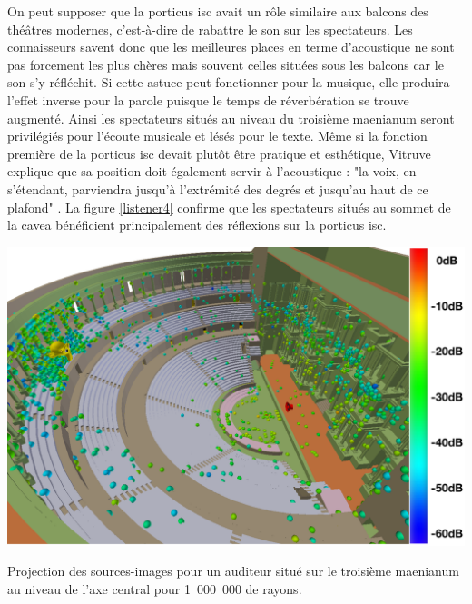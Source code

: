  

On peut supposer que la \gls{porticus isc} avait un rôle similaire aux balcons des théâtres modernes, c'est-à-dire de rabattre le son sur les spectateurs. Les connaisseurs savent donc que les meilleures places en terme d'acoustique ne sont pas forcement les plus chères mais souvent celles situées sous les balcons car le son s'y réfléchit. Si cette astuce peut fonctionner pour la musique, elle produira l'effet inverse pour la parole puisque le temps de réverbération se trouve augmenté. Ainsi les spectateurs situés au niveau du troisième \gls{maenianum} seront privilégiés pour l'écoute musicale et lésés pour le texte. Même si la fonction première de la \gls{porticus isc} devait plutôt être pratique et esthétique, Vitruve explique que sa position doit également servir à l'acoustique : "la voix, en s'étendant, parviendra jusqu'à l'extrémité des degrés et jusqu'au haut de ce plafond" \cite[p.11]{vitruve}. La figure \ref{listener4} confirme que les spectateurs situés au sommet de la \gls{cavea} bénéficient principalement des réflexions sur la \gls{porticus isc}.
\begin{figureth}
	\includegraphics[width=0.8\linewidth]{images/Listener4}
	\caption{Projection des sources-images pour un auditeur situé sur le troisième \gls{maenianum} au niveau de l'axe central pour 1~000~000 de rayons.}
	\label{listener4}
\end{figureth}

